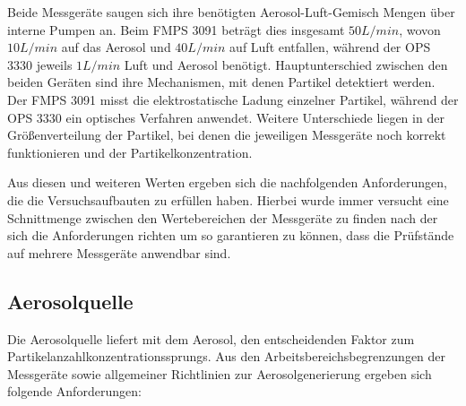 Beide Messger\"{a}te saugen sich ihre ben\"{o}tigten Aerosol-Luft-Gemisch Mengen \"{u}ber interne Pumpen an. Beim FMPS 3091 betr\"{a}gt dies insgesamt $50 L/min$, wovon $10 L/min$ auf das Aerosol und $40 L/min$ auf Luft entfallen, w\"{a}hrend der OPS 3330 jeweils $1 L/min$ Luft und Aerosol ben\"{o}tigt. Hauptunterschied zwischen den beiden Ger\"{a}ten sind ihre Mechanismen, mit denen Partikel detektiert werden. Der FMPS 3091 misst die elektrostatische Ladung einzelner Partikel, w\"{a}hrend der OPS 3330 ein optisches Verfahren anwendet. Weitere Unterschiede liegen in der Gr\"{o}{\ss}enverteilung der Partikel, bei denen die jeweiligen Messger\"{a}te noch korrekt funktionieren und der Partikelkonzentration. 

Aus diesen und weiteren Werten ergeben sich die nachfolgenden Anforderungen, die die Versuchsaufbauten zu erf\"{u}llen haben. Hierbei wurde immer versucht eine Schnittmenge zwischen den Wertebereichen der Messger\"{a}te zu finden nach der sich die Anforderungen richten um so garantieren zu k\"{o}nnen, dass die Pr\"{u}fst\"{a}nde auf mehrere Messger\"{a}te anwendbar sind.   

\subsection{Aerosolquelle}
Die Aerosolquelle liefert mit dem Aerosol, den entscheidenden Faktor zum Partikelanzahlkonzentrationssprungs. Aus den Arbeitsbereichsbegrenzungen der Messger\"{a}te sowie allgemeiner Richtlinien zur Aerosolgenerierung ergeben sich folgende Anforderungen:

